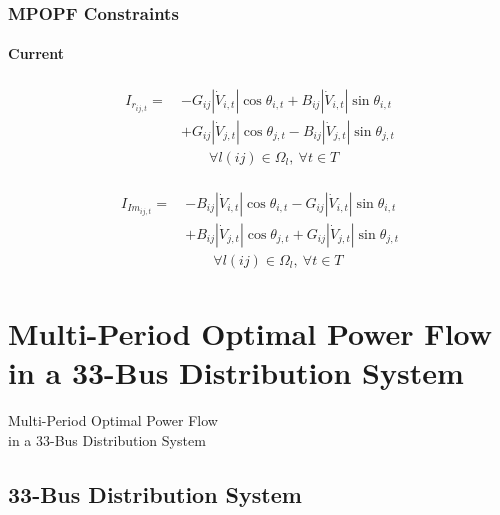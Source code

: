 \documentclass[
	11pt, %
	aspectratio=169, %
]{beamer}
\begin{document}
\begin{frame}
	\frametitle{MPOPF Constraints}
	\framesubtitle{Current} %

	\begin{align}
	\label{eq:Mexpr_i_re}
		\begin{split}
			I_{r_{ij,t}} =\ &-G_{ij}\left\lvert \dot{V}_{i,t} \right\rvert \cos{\theta_{i,t}} + B_{ij}\left\lvert \dot{V}_{i,t} \right\rvert \sin{\theta_{i,t}} \\
					&+ G_{ij}\left\lvert \dot{V}_{j,t} \right\rvert \cos{\theta_{j,t}} - B_{ij}\left\lvert \dot{V}_{j,t} \right\rvert \sin{\theta_{j,t}} \\[1em]
			&\qquad \forall l(ij) \in \Omega_{l},\  \forall t \in T
		\end{split}
	\end{align}

	\begin{align}
	\label{eq:Mexpr_i_imag}
		\begin{split}
			I_{Im_{ij,t}} =\ &-B_{ij}\left\lvert \dot{V}_{i,t} \right\rvert \cos{\theta_{i,t}} - G_{ij}\left\lvert \dot{V}_{i,t} \right\rvert \sin{\theta_{i,t}} \\
			&+ B_{ij}\left\lvert \dot{V}_{j,t} \right\rvert \cos{\theta_{j,t}} + G_{ij}\left\lvert \dot{V}_{j,t} \right\rvert \sin{\theta_{j,t}} \\[1em]
			&\qquad \forall l(ij) \in \Omega_{l},\ \forall t \in T
		\end{split}
	\end{align}

\end{frame}
	

\section{Multi-Period Optimal Power Flow in a 33-Bus Distribution System}

\begin{frame}
    \centering
    \LARGE
    Multi-Period Optimal Power Flow \\ in a 33-Bus Distribution System
\end{frame}


\subsection{33-Bus Distribution System}
\end{document}
